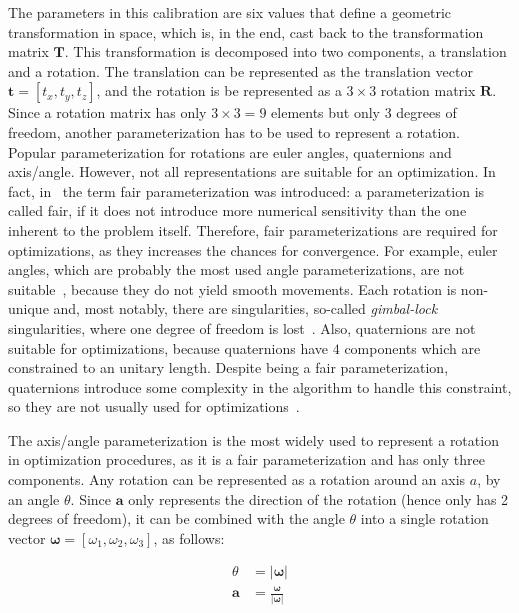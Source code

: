 \documentclass[conference]{IEEEtran}
\begin{document}
The parameters in this calibration are six values that define a geometric transformation in space, which is, in the end, cast back to the transformation matrix $\bm{T}$. This transformation is decomposed into two components, a translation and a rotation. The translation can be represented as the translation vector $\mathbf{t} = \left[t_x, t_y, t_z\right]$, and the rotation is be represented as a $3 \times 3$ rotation matrix $\bm{R}$. Since a rotation matrix has only $3 \times 3 = 9$ elements but only 3 degrees of freedom, another parameterization has to be used to represent a rotation. Popular parameterization for rotations are euler angles, quaternions and axis/angle. However, not all representations are suitable for an optimization. In fact, in~\cite{hornegger99} the term fair parameterization was introduced: a parameterization is called fair, if it does not introduce more numerical sensitivity than the one inherent to the problem itself. Therefore, fair parameterizations are required for optimizations, as they increases the chances for convergence. For example, euler angles, which are probably the most used angle parameterizations, are not suitable~\cite{schmidt01}, because they do not yield smooth movements. Each rotation is non-unique and, most notably, there are singularities, so-called \textit{gimbal-lock} singularities, where one degree of freedom is lost~\cite{schmidt01}. Also, quaternions are not suitable for optimizations, because quaternions have $4$ components which are constrained to an unitary length. Despite being a fair parameterization, quaternions introduce some complexity in the algorithm to handle this constraint, so they are not usually used for optimizations~\cite{schmidt01}.

The axis/angle parameterization is the most widely used to represent a rotation in optimization procedures, as it is a fair parameterization and has only three components. Any rotation can be represented as a rotation around an axis $a$, by an angle $\theta$. Since $\bm{a}$ only represents the direction of the rotation (hence only has 2 degrees of freedom), it can be combined with the angle $\theta$ into a single rotation vector $\bm{\omega} = \left[\omega_1, \omega_2, \omega_3\right]$, as follows:

\begin{equation}
    \label{eqn:axis-angle}
    \begin{aligned}
        \theta & = |\bm{\omega}| \\
        \bm{a} & = \frac{\bm{\omega}}{|\bm{\omega}|}
    \end{aligned}
\end{equation}
\end{document}
